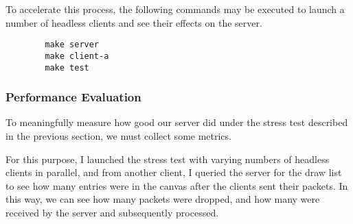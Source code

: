 \documentclass{article}
\begin{document}
To accelerate this process, the following commands may be executed to launch a
number of headless clients and see their effects on the server.

\begin{subbox}{}
    \begin{lstlisting}
        make server
        make client-a
        make test
    \end{lstlisting}
\end{subbox}

\subsubsection{Performance Evaluation}


To meaningfully measure how good our server did under the stress test described in the previous section, we must collect some metrics.

For this purpose, I launched the stress test with varying numbers of headless clients in parallel, and from another client, I queried the server for the draw list to see how many entries were in the canvas after the clients sent their packets. In this way, we
can see how many packets were dropped, and how many were received by the server and subsequently processed.

\begin{figure}[h]
    \centering
\end{figure}
\end{document}
